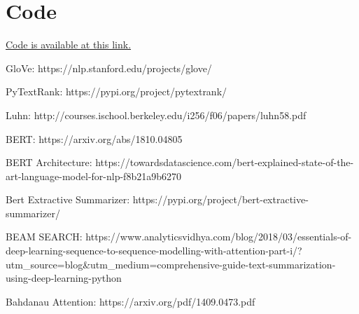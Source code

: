 \documentclass[fleqn,10pt]{SelfArx} %
\begin{document}
\section*{Code}
\href{https://github.com/RCrvro/Text-Summarization-Project}{Code is available at this link.}



GloVe: https://nlp.stanford.edu/projects/glove/

PyTextRank: https://pypi.org/project/pytextrank/

Luhn: http://courses.ischool.berkeley.edu/i256/f06/papers/luhn58.pdf

BERT: https://arxiv.org/abs/1810.04805

BERT Architecture: https://towardsdatascience.com/bert-explained-state-of-the-art-language-model-for-nlp-f8b21a9b6270

Bert Extractive Summarizer: https://pypi.org/project/bert-extractive-summarizer/

BEAM SEARCH: https://www.analyticsvidhya.com/blog/2018/03/essentials-of-deep-learning-sequence-to-sequence-modelling-with-attention-part-i/?utm_source=blog&utm_medium=comprehensive-guide-text-summarization-using-deep-learning-python 

Bahdanau Attention: https://arxiv.org/pdf/1409.0473.pdf
\end{document}
